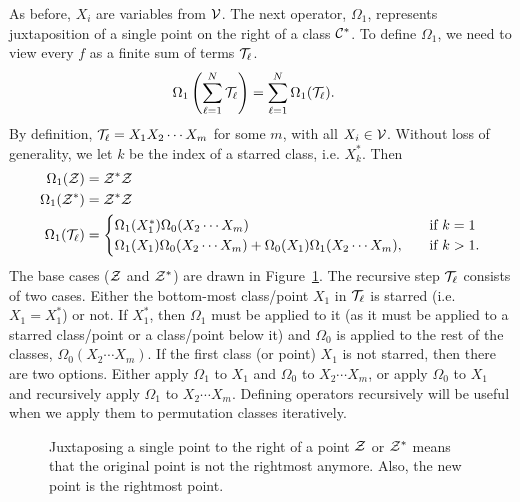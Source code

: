 \message{ !name(thesis.tex)}\documentclass[12pt, a4paper, twoside]{report}
\begin{document}
As before, $X_i$ are variables from $\mathcal{V}$. The next operator, $\Omega_1$, represents juxtaposition of a single point on the right of a class $\mathcal{C}^*$. To define $\Omega_1$, we need to view every $f$ as a finite sum of terms $\mathcal{T}_\ell$. 
\begin{align*}
\Omega_1\left(\sum_{\ell=1}^N \mathcal{T}_\ell\right) &= \sum_{\ell=1}^N \Omega_1(\mathcal{T}_\ell).
\end{align*}
By definition, $\mathcal{T}_\ell = X_1X_2\cdots X_m$ for some $m$, with all $X_i \in \mathcal{V}$. Without loss of generality, we let $k$ be the index of a starred class, i.e. $X_k^*$. Then
\begin{align*}
    \Omega_1(\mathcal{Z}) &= \mathcal{Z}^*\mathcal{Z}\\
  \Omega_1(\mathcal{Z}^*) &= \mathcal{Z}^*\mathcal{Z}\\
  \Omega_1(\mathcal{T}_\ell) &=
                      \begin{cases}
                        \Omega_1(X_1^*)\Omega_0(X_2\cdots X_m) \quad &\text{if $k = 1$}\\
                        \Omega_1(X_1)\Omega_0(X_2\cdots X_m) + \Omega_0(X_1)\Omega_1(X_2\cdots X_m),\quad &\text{if $k>1$.}
                      \end{cases}
\end{align*}
The base cases ($\mathcal{Z}$ and $\mathcal{Z}^*$) are drawn in Figure~\ref{fig:omega_1}. The recursive step $\mathcal{T}_\ell$ consists of two cases. Either the bottom-most class/point $X_1$ in $\mathcal{T}_\ell$ is starred (i.e. $X_1 = X_1^*$) or not. If $X_1^*$, then $\Omega_1$ must be applied to it (as it must be applied to a starred class/point or a class/point below it) and $\Omega_0$ is applied to the rest of the classes, $\Omega_0(X_2\cdots X_m)$. If the first class (or point) $X_1$ is not starred, then there are two options. Either apply $\Omega_1$ to $X_1$ and $\Omega_0$ to $X_2\cdots X_m$, or apply $\Omega_0$ to $X_1$ and recursively apply $\Omega_1$ to $X_2\cdots X_m$. Defining operators recursively will be useful when we apply them to permutation classes iteratively.
\begin{figure}[ht]
 \centering
    \caption{Juxtaposing a single point to the right of a point $\mathcal{Z}$ or $\mathcal{Z}^*$ means that the original point is not the rightmost anymore. Also, the new point is the rightmost point.}
    \label{fig:omega_1}
\end{figure}
\end{document}
